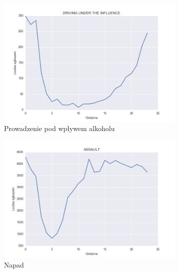 \documentclass[11pt]{article} %
\begin{document}
\begin{figure}[h]
\centering
   \begin{subfigure}{0.48\linewidth}
   \centering
   \includegraphics[width=\linewidth]{images/crimes_per_hour/6}
   \caption{Prowadzenie pod wpływem alkoholu}
   \label{fig:crimes_per_hour_1} 
\end{subfigure}
\hfill
\begin{subfigure}{0.48\linewidth}
   \centering
   \includegraphics[width=\linewidth]{images/crimes_per_hour/1}
   \caption{Napad}
   \label{fig:crimes_per_hour_2}
\end{subfigure}
\\[\baselineskip]
\begin{subfigure}{0.48\linewidth}
   \centering

\end{subfigure}
\end{figure}
\end{document}
